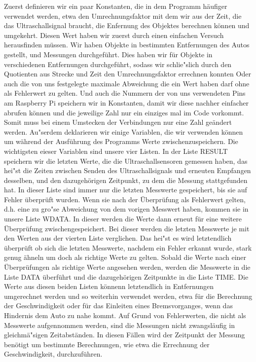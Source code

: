 \documentclass[a4paper,12pt]{article}
\begin{document}
\medskip

Zuerst definieren wir ein paar Konstanten, die in dem Programm h\"aufiger verwendet werden, etwa den Umrechnungsfaktor mit
dem wir aus der Zeit, die das Ultraschallsignal braucht, die Enfernung des Objektes berechnen k\"onnen und umgekehrt.
Diesen Wert haben wir zuerst durch einen einfachen Versuch herausfinden m\"ussen. Wir haben Objekte in bestimmten
Entfernungen des Autos gestellt, und Messungen durchgef\"uhrt. Dies haben wir f\"ur Objekte in verschiedenen Entfernungen
durchgef\"uhrt, sodass wir schlie"slich durch den Quotienten aus Strecke und Zeit den Umrechnungsfaktor errechnen konnten
Oder auch die von uns festgelegte maximale Abweichung die ein Wert haben darf ohne als Fehlerwert zu gelten. Und auch
die Nummern der von uns verwendeten Pins am Raspberry Pi speichern wir in Konstanten, damit wir diese nachher einfacher
abrufen k\"onnen und die jeweilige Zahl nur ein einziges mal im Code vorkommt. Somit muss bei einem Umstecken der
Verbindungen nur eine Zahl ge\"andert werden.
\newline
Au"serdem deklarieren wir einige Variablen, die wir verwenden k\"onnen um w\"ahrend der Ausf\"uhrung des Programms Werte
zwischenzuspeichern. Die wichtigsten eieser Variablen sind unsere vier Listen. In der Liste RESULT speichern wir die
letzten Werte, die die Ultraschallsensoren gemessen haben, das hei"st die Zeiten zwischen Senden des Ultraschallsignals
und erneuten Empfangen desselben, und den dazugeh\"origen Zeitpunkt, zu dem die Messung stattgefunden hat. In dieser
Liste sind immer nur die letzten Messwerte gespeichert, bis sie auf Fehler \"uberpr\"uft wurden. Wenn sie nach der
\"Uberpr\"ufung als Fehlerwert gelten, d.h. eine zu gro"se Abweichung von dem vorigen Messwert haben, kommen sie in
unsere Liste WDATA. In dieser werden die Werte dann erneut f\"ur eine weitere \"Uberpr\"ufung zwischengespeichert. Bei
dieser werden die letzten Messwerte je mit den Werten aus der vierten Liste verglichen. Das hei"st es wird letztendlich
\"uberpr\"uft ob sich die letzten Messwerte, nachdem ein Fehler erkannt wurde, stark genug \"ahneln um doch als richtige
Werte zu gelten. Sobald die Werte nach einer \"Uberpr\"ufungen als richtige Werte angesehen werden, werden die Messwerte
in die Liste DATA \"uberf\"uhrt und die dazugeh\"origen Zeitpunkte in die Liste TIME. Die Werte aus diesen beiden Listen
k\"onnenn letztendlich in Entfernungen umgerechnet werden und so weiterhin verwendet werden, etwa f\"ur die Berechnung der
Geschwindigkeit oder f\"ur das Einleiten eines Bremsvorganges, wenn das Hindernis dem Auto zu nahe kommt. Auf Grund von
Fehlerwerten, die nicht als Messwerte aufgennommen werden, sind die Messungen nicht zwangsl\"aufig in gleichm\"a"sigen
Zeitabst\"anden. In diesen F\"allen wird der Zeitpunkt der Messung ben\"otigt um bestimmte Berechnungen, wie etwa die
Errechnung der Geschwindigkeit, durchzuf\"uhren.
\end{document}
